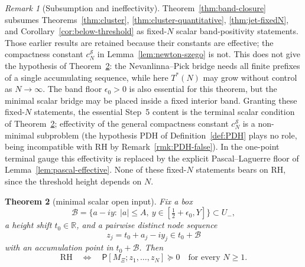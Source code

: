 \documentclass[11pt]{amsart}
\newtheorem{theorem}{Theorem}[section]
\theoremstyle{definition}
\theoremstyle{remark}
\newtheorem{remark}[theorem]{Remark}
\theoremstyle{definition}
\newcommand{\half}{\tfrac{1}{2}}
\newcommand{\R}{\mathbb{R}}
\begin{document}
\begin{remark}[Subsumption and ineffectivity]\label{rmk:band-honest}
Theorem~\ref{thm:band-closure} subsumes Theorems~\ref{thm:cluster},
\ref{thm:cluster-quantitative}, \ref{thm:jet-fixedN}, and Corollary~\ref{cor:below-threshold} as
fixed-$N$ scalar band-positivity statements.  Those earlier results are retained because their
constants are effective; the compactness constant $c_N^{\mathcal S}$ in
Lemma~\ref{lem:newton-szego} is not.  This does not give the hypothesis of
Theorem~\ref{thm:minimal-input}: the Nevanlinna--Pick bridge needs all finite prefixes of a single accumulating sequence, while here
$T^*(N)$ may grow without control as $N\to\infty$.  The band floor $\epsilon_0>0$ is also essential
for this theorem, but the minimal scalar bridge may be placed inside a fixed interior band.  Granting
these fixed-$N$ statements, the essential Step~5 content is the terminal scalar condition of
Theorem~\ref{thm:minimal-input}; effectivity of the general compactness constant
$c_N^{\mathcal S}$ is a non-minimal subproblem (the hypothesis PDH of Definition~\ref{def:PDH} plays no
role, being incompatible with RH by Remark~\ref{rmk:PDH-false}).  In the one-point terminal gauge this
effectivity is replaced by the explicit Pascal--Laguerre floor of Lemma~\ref{lem:pascal-effective}.  None of these fixed-$N$
statements bears on RH, since the threshold height depends on $N$.
\end{remark}

\begin{theorem}[minimal scalar open input]\label{thm:minimal-input}
Fix a box
\[
   \mathcal B=\{a-iy:\ |a|\le A,\ y\in[\half+\epsilon_0,Y]\}\subset U_-,
\]
a height shift $t_0\in\R$, and a pairwise distinct node sequence
\[
   z_j=t_0+a_j-iy_j\in t_0+\mathcal B
\]
with an accumulation point in $t_0+\mathcal B$.  Then
\[
   \mathrm{RH}
   \quad\Longleftrightarrow\quad
   \mathsf P[M_\Xi;z_1,\ldots,z_N]\succeq0
   \quad\text{for every }N\ge1 .
\]
\end{theorem}
\end{document}
